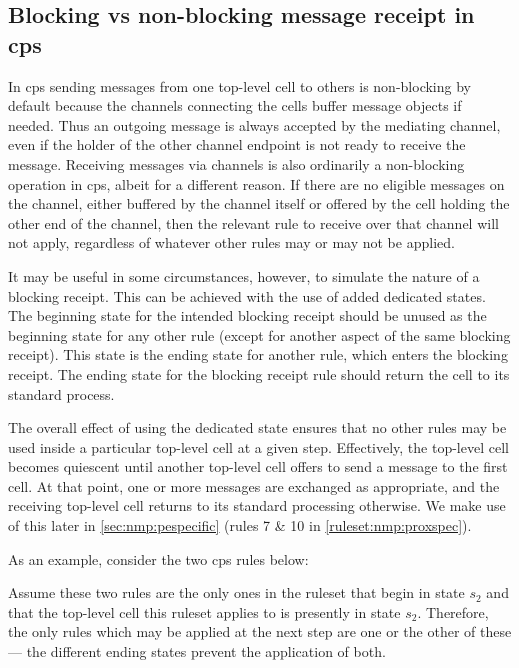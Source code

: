 \subsection{\label{sec:nmp:blocking}Blocking vs non-blocking message receipt in \texorpdfstring{\gls{cps}}{cP systems}}
In \gls{cps} sending messages from one top-level cell to others is non-blocking by default because the channels connecting the cells buffer message objects if needed. Thus an outgoing message is always accepted by the mediating channel, even if the holder of the other channel endpoint is not ready to receive the message.  Receiving messages via channels is also ordinarily a non-blocking operation in \gls{cps}, albeit for a different reason.  If there are no eligible messages on the channel, either buffered by the channel itself or offered by the cell holding the other end of the channel, then the relevant rule to receive over that channel will not apply, regardless of whatever other rules may or may not be applied.

It may be useful in some circumstances, however, to simulate the nature of a blocking receipt.  This can be achieved with the use of added dedicated states.  The beginning state for the intended blocking receipt should be unused as the beginning state for any other rule (except for another aspect of the same blocking receipt).  This state is the ending state for another rule, which enters the blocking receipt.  The ending state for the blocking receipt rule should return the cell to its standard process.

The overall effect of using the dedicated state ensures that no other rules may be used inside a particular top-level cell at a given step.  Effectively, the top-level cell becomes quiescent until another top-level cell offers to send a message to the first cell.  At that point, one or more messages are exchanged as appropriate, and the receiving top-level cell returns to its standard processing otherwise.  We make use of this later in \autoref{sec:nmp:pespecific} (rules 7 \& 10 in \autoref{ruleset:nmp:proxspec}).

As an example, consider the two \gls{cps} rules below:
\begin{framed}
\vspace{-0.3cm}
\vspace{-0.7cm}
\end{framed}\noindent
Assume these two rules are the only ones in the ruleset that begin in state \(s_2\) and that the top-level cell this ruleset applies to is presently in state \(s_2\).  Therefore, the only rules which may be applied at the next step are one or the other of these --- the different ending states prevent the application of both.

